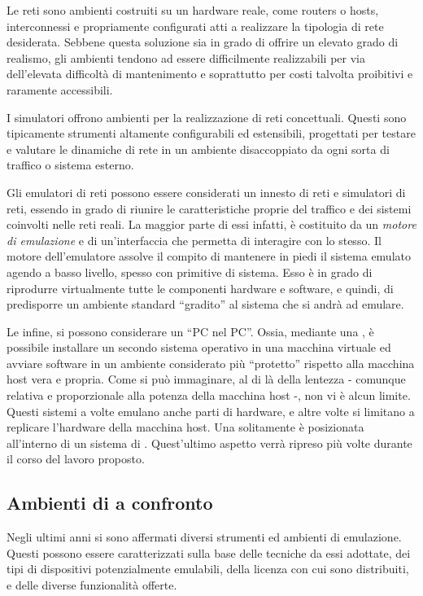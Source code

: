 Le reti \testbed{} sono ambienti costruiti su un hardware reale, come routers o hosts, interconnessi e propriamente configurati atti a realizzare la tipologia di rete desiderata. Sebbene questa soluzione sia in grado di offrire un elevato grado di realismo, gli ambienti \testbed{} tendono ad essere difficilmente realizzabili per via dell'elevata difficoltà di mantenimento e soprattutto per costi talvolta proibitivi e raramente accessibili.

I simulatori offrono ambienti per la realizzazione di reti concettuali. Questi sono tipicamente strumenti altamente configurabili ed estensibili, progettati per testare e valutare le dinamiche di rete in un ambiente disaccoppiato da ogni sorta di traffico o sistema esterno. 

Gli emulatori di reti possono essere considerati un innesto di reti \testbed{} e simulatori di reti, essendo in grado di riunire le caratteristiche proprie del traffico e dei sistemi coinvolti nelle reti reali. La maggior parte di essi infatti, è costituito da un \emph{motore di emulazione} e di un'interfaccia che permetta di interagire con lo stesso. Il motore dell'emulatore assolve il compito di mantenere in piedi il sistema emulato agendo a basso livello, spesso con primitive di sistema. Esso è in grado di riprodurre virtualmente tutte le componenti hardware e software, e quindi, di predisporre un ambiente standard ``gradito'' al sistema che si andrà ad emulare.

Le \virtualmachine{} infine, si possono considerare un ``PC nel PC''. Ossia, mediante una \virtualmachine{}, è possibile installare un secondo sistema operativo in una macchina virtuale ed avviare software in un ambiente considerato più ``protetto'' rispetto alla macchina host vera e propria. Come si può immaginare, al di là della lentezza - comunque relativa e proporzionale alla potenza della macchina host -, non vi è alcun limite. Questi sistemi a volte emulano anche parti di hardware, e altre volte si limitano a replicare l'hardware della macchina host. Una \virtualmachine{} solitamente è posizionata all'interno di un sistema di \emulazione{}. Quest'ultimo aspetto verrà ripreso più volte durante il corso del lavoro proposto.


\subsection{Ambienti di \emulazione{} a confronto}
Negli ultimi anni si sono affermati diversi strumenti ed ambienti di emulazione. Questi possono essere caratterizzati sulla base delle tecniche da essi adottate, dei tipi di dispositivi potenzialmente emulabili, della licenza con cui sono distribuiti, e delle diverse funzionalità offerte.

